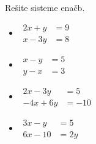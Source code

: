         
            \begin{naloga}
                Rešite sisteme enačb.
                \begin{itemize}
                    
                        \item $\begin{aligned}
                            2x+y&=9 \\ x-3y&=8
                        \end{aligned}$ 
                        \item $\begin{aligned}
                            x-y&=5 \\ y-x&=3
                        \end{aligned}$ 
                        \item $\begin{aligned}
                            2x-3y&=5 \\ -4x+6y&=-10
                        \end{aligned}$ 
                        \item $\begin{aligned}
                            3x-y&=5 \\ 6x-10&=2y
                        \end{aligned}$ 
                    

                \end{itemize}
            \end{naloga}
        


